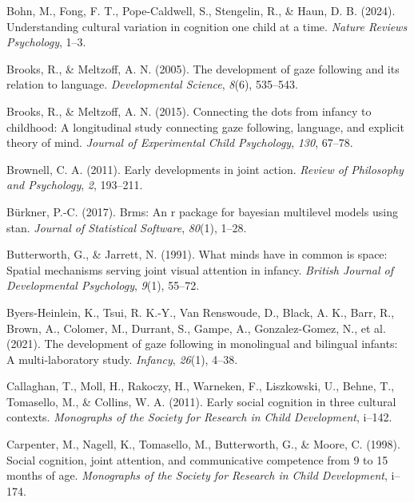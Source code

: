 \documentclass[
  man,floatsintext]{apa7}
\newlength{\cslhangindent}
\newlength{\cslentryspacingunit} %
\newenvironment{CSLReferences}[2] %
 {%
  \setlength{\parindent}{0pt}
  \ifodd #1
  \let\oldpar\par
  \def\par{\hangindent=\cslhangindent\oldpar}
  \fi
  \setlength{\parskip}{#2\cslentryspacingunit}
 }%
 {}
\begin{document}
\begin{CSLReferences}{1}{0}
\leavevmode{}%
Bohn, M., Fong, F. T., Pope-Caldwell, S., Stengelin, R., \& Haun, D. B. (2024). Understanding cultural variation in cognition one child at a time. \emph{Nature Reviews Psychology}, 1--3.

\leavevmode{}%
Brooks, R., \& Meltzoff, A. N. (2005). The development of gaze following and its relation to language. \emph{Developmental Science}, \emph{8}(6), 535--543.

\leavevmode{}%
Brooks, R., \& Meltzoff, A. N. (2015). Connecting the dots from infancy to childhood: A longitudinal study connecting gaze following, language, and explicit theory of mind. \emph{Journal of Experimental Child Psychology}, \emph{130}, 67--78.

\leavevmode{}%
Brownell, C. A. (2011). Early developments in joint action. \emph{Review of Philosophy and Psychology}, \emph{2}, 193--211.

\leavevmode{}%
Bürkner, P.-C. (2017). Brms: An r package for bayesian multilevel models using stan. \emph{Journal of Statistical Software}, \emph{80}(1), 1--28.

\leavevmode{}%
Butterworth, G., \& Jarrett, N. (1991). What minds have in common is space: Spatial mechanisms serving joint visual attention in infancy. \emph{British Journal of Developmental Psychology}, \emph{9}(1), 55--72.

\leavevmode{}%
Byers-Heinlein, K., Tsui, R. K.-Y., Van Renswoude, D., Black, A. K., Barr, R., Brown, A., Colomer, M., Durrant, S., Gampe, A., Gonzalez-Gomez, N., et al. (2021). The development of gaze following in monolingual and bilingual infants: A multi-laboratory study. \emph{Infancy}, \emph{26}(1), 4--38.

\leavevmode{}%
Callaghan, T., Moll, H., Rakoczy, H., Warneken, F., Liszkowski, U., Behne, T., Tomasello, M., \& Collins, W. A. (2011). Early social cognition in three cultural contexts. \emph{Monographs of the Society for Research in Child Development}, i--142.

\leavevmode{}%
Carpenter, M., Nagell, K., Tomasello, M., Butterworth, G., \& Moore, C. (1998). Social cognition, joint attention, and communicative competence from 9 to 15 months of age. \emph{Monographs of the Society for Research in Child Development}, i--174.


\end{CSLReferences}
\end{document}
